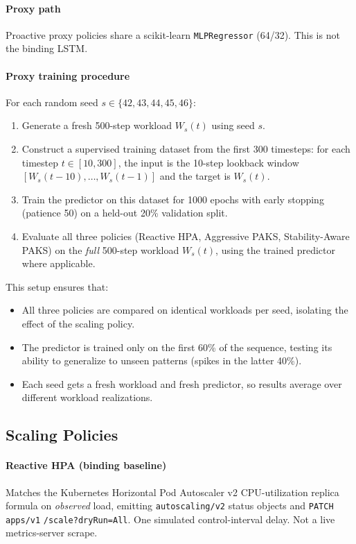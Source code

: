 \paragraph{Proxy path} Proactive proxy policies share a scikit-learn \texttt{MLPRegressor} (64/32). This is not the binding LSTM.

\paragraph{Proxy training procedure} For each random seed $s \in \{42, 43, 44, 45, 46\}$:
\begin{enumerate}
  \item Generate a fresh 500-step workload $W_s(t)$ using seed $s$.
  \item Construct a supervised training dataset from the first 300 timesteps: for each timestep $t \in [10, 300]$, the input is the 10-step lookback window $[W_s(t-10), \ldots, W_s(t-1)]$ and the target is $W_s(t)$.
  \item Train the predictor on this dataset for 1000 epochs with early stopping (patience 50) on a held-out 20\% validation split.
  \item Evaluate all three policies (Reactive HPA, Aggressive PAKS, Stability-Aware PAKS) on the \emph{full} 500-step workload $W_s(t)$, using the trained predictor where applicable.
\end{enumerate}

This setup ensures that:
\begin{itemize}
  \item All three policies are compared on identical workloads per seed, isolating the effect of the scaling policy.
  \item The predictor is trained only on the first 60\% of the sequence, testing its ability to generalize to unseen patterns (spikes in the latter 40\%).
  \item Each seed gets a fresh workload and fresh predictor, so results average over different workload realizations.
\end{itemize}

\subsection{Scaling Policies}

\paragraph{Reactive HPA (binding baseline)} Matches the Kubernetes Horizontal Pod Autoscaler v2 CPU-utilization replica formula on \emph{observed} load, emitting \texttt{autoscaling/v2} status objects and \texttt{PATCH} \texttt{apps/v1} \texttt{/scale?dryRun=All}. One simulated control-interval delay. Not a live metrics-server scrape.

